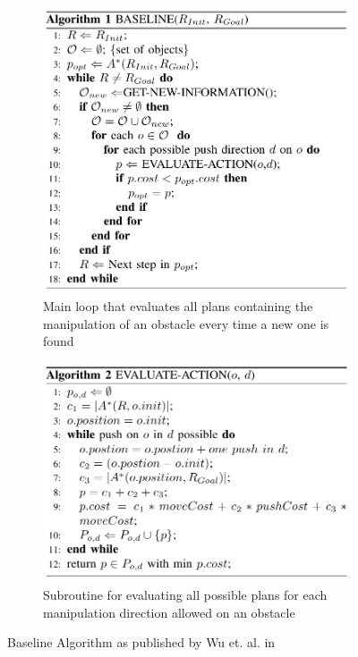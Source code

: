 \begin{figure}[H]
\centering
\begin{subfigure}{.5\textwidth}
  \centering
  \includegraphics[width=\linewidth]{Figures/Wu_Original_Algorithm/algo1.png}
  \caption{Main loop that evaluates all plans containing the manipulation of an obstacle every time a new one is found}
  \label{fig:Wu_Original_Algorithm-algo1}
\end{subfigure}%
\begin{subfigure}{.5\textwidth}
  \centering
  \includegraphics[width=\linewidth]{Figures/Wu_Original_Algorithm/algo2.png}
  \caption{Subroutine for evaluating all possible plans for each manipulation direction allowed on an obstacle}
  \label{fig:Wu_Original_Algorithm-algo2}
\end{subfigure}
\caption{Baseline Algorithm as published by Wu et. al. in \parencite{wu_navigation_2010}}
\label{fig:Wu_Original_Algorithm-baseline}
\end{figure}

